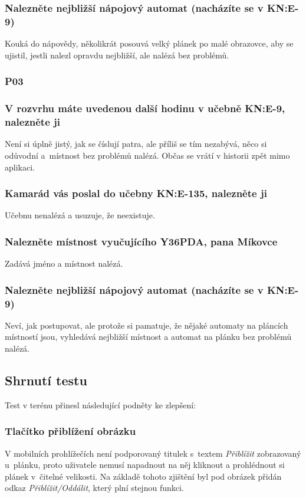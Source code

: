 \subsubsection*{Nalezněte nejbližší nápojový automat (nacházíte se v KN:E-9)}
Kouká do nápovědy, několikrát posouvá velký plánek po malé obrazovce, aby se ujistil, jestli nalezl opravdu nejbližší, ale nalézá bez problémů.

\subsubsection{P03}
\subsubsection*{V rozvrhu máte uvedenou další hodinu v učebně KN:E-9, nalezněte ji}
Není si úplně jistý, jak se číslují patra, ale příliš se tím nezabývá, něco si odůvodní a~místnost bez problémů nalézá. Občas se vrátí v historii zpět mimo aplikaci.
\subsubsection*{Kamarád vás poslal do učebny KN:E-135, nalezněte ji}
Učebnu nenalézá a usuzuje, že neexistuje.
\subsubsection*{Nalezněte místnost vyučujícího Y36PDA, pana Míkovce}
Zadává jméno a místnost nalézá.
\subsubsection*{Nalezněte nejbližší nápojový automat (nacházíte se v KN:E-9)}
Neví, jak postupovat, ale protože si pamatuje, že nějaké automaty na pláncích místností jsou, vyhledává nejbližší místnost a automat na plánku bez problémů nalézá.

\pagebreak
\subsection{Shrnutí testu}
Test v terénu přinesl následující podněty ke zlepšení:
\subsubsection*{Tlačítko přiblížení obrázku}
V mobilních prohlížečích není podporovaný titulek s~textem \emph{Přiblížit} zobrazovaný u~plán\-ku, proto uživatele nemusí napadnout na něj kliknout a prohlédnout si plánek v~čitelné velikosti. Na základě tohoto zjištění byl pod obrázek přidán odkaz \emph{Přiblížit/Oddálit}, který plní stejnou funkci.
